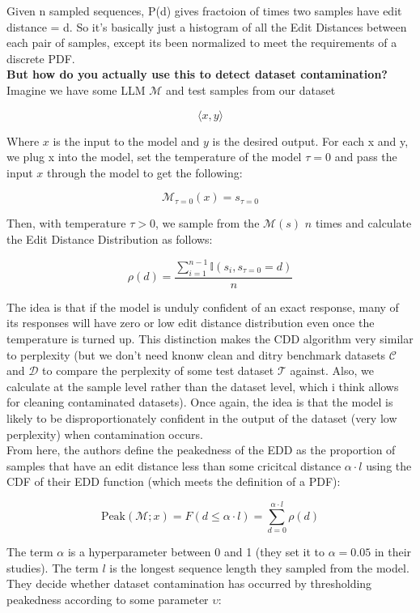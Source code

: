 \documentclass[12pt]{article}
\begin{document}
Given n sampled sequences, P(d) gives fractoion of times two samples have edit distance = d. So it's basically just a histogram of all the Edit Distances between each pair of samples, except its been normalized to meet the requirements of a discrete PDF. \\


\textbf{But how do you actually use this to detect dataset contamination?}\\

Imagine we have some LLM \(\mathcal{M}\) and test samples from our dataset 

\[\langle x, y \rangle\]

Where \(x\) is the input to the model and \(y\) is the desired output. For each x and y, we plug x into the model, set the temperature of the model \(\tau=0\) and pass the input \(x\) through the model to get the following:

\[\mathcal{M}_{\tau=0}(x) = s_{\tau=0}\]

Then, with temperature \(\tau > 0\), we sample from the \(\mathcal{M}(s)\) \(n\) times and calculate the Edit Distance Distribution as follows:

\[\rho(d) = \frac{\sum_{i=1}^{n-1}\mathbb{I}(s_i, s_{\tau=0} = d)}{n}\]

The idea is that if the model is unduly confident of an exact response, many of its responses will have zero or low edit distance distribution even once the temperature is turned up. This distinction makes the CDD algorithm very similar to perplexity (but we don't need knonw clean and ditry benchmark datasets \(\mathcal{C}\) and \(\mathcal{D}\) to compare the perplexity of some test dataset \(\mathcal{T}\) against. Also, we calculate at the sample level rather than the dataset level, which i think allows for cleaning contaminated datasets). Once again, the idea is that the model is likely to be disproportionately confident in the output of the dataset (very low perplexity) when contamination occurs. \\

From here, the authors define the peakedness of the EDD as the proportion of samples that have an edit distance less than some cricitcal distance \(\alpha \cdot l\) using the CDF of their EDD function (which meets the definition of a PDF):

\[\text{Peak}(\mathcal{M};x) = F(d \leq \alpha \cdot l) = \sum_{d=0}^{\alpha \cdot l}\rho(d)\]

The term \(\alpha\) is a hyperparameter between 0 and 1 (they set it to \(\alpha = 0.05\) in their studies). The term \(l\) is the longest sequence length they sampled from the model. They decide whether dataset contamination has occurred by thresholding peakedness according to some parameter \(\upsilon\):
\end{document}
